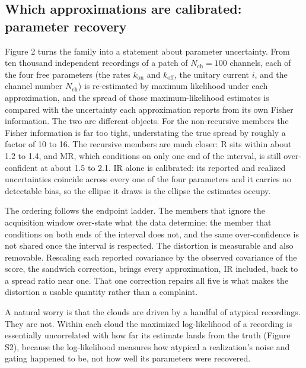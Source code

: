 \subsection*{Which approximations are calibrated: parameter recovery}

Figure 2 turns the family into a statement about parameter uncertainty. From ten thousand independent recordings of a patch of $N_{\mathrm{ch}}=100$ channels, each of the four free parameters (the rates $k_{\mathrm{on}}$ and $k_{\mathrm{off}}$, the unitary current $i$, and the channel number $N_{\mathrm{ch}}$) is re-estimated by maximum likelihood under each approximation, and the spread of those maximum-likelihood estimates is compared with the uncertainty each approximation reports from its own Fisher information. The two are different objects. For the non-recursive members the Fisher information is far too tight, understating the true spread by roughly a factor of 10 to 16. %
The recursive members are much closer: R sits within about 1.2 to 1.4, and MR, which conditions on only one end of the interval, is still over-confident at about 1.5 to 2.1. %
IR alone is calibrated: its reported and realized uncertainties coincide across every one of the four parameters and it carries no detectable bias, so the ellipse it draws is the ellipse the estimates occupy. %

The ordering follows the endpoint ladder. The members that ignore the acquisition window over-state what the data determine; the member that conditions on both ends of the interval does not, and the same over-confidence is not shared once the interval is respected. %
The distortion is measurable and also removable. Rescaling each reported covariance by the observed covariance of the score, the sandwich correction, brings every approximation, IR included, back to a spread ratio near one. %
That one correction repairs all five is what makes the distortion a usable quantity rather than a complaint.

A natural worry is that the clouds are driven by a handful of atypical recordings. They are not. Within each cloud the maximized log-likelihood of a recording is essentially uncorrelated with how far its estimate lands from the truth (Figure S2), because the log-likelihood measures how atypical a realization's noise and gating happened to be, not how well its parameters were recovered. %

